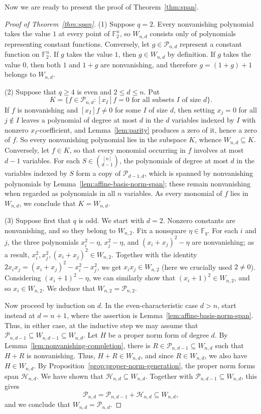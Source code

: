 \documentclass[12pt,reqno]{amsart}
\theoremstyle{definition}
\newcommand{\F}{\mathbb{F}}
\newcommand{\cH}{\mathcal H}
\newcommand{\cP}{\mathcal P}
\begin{document}
Now we are ready to present the proof of Theorem~\ref{thm:span}.

\begin{proof}[Proof of Theorem~\ref{thm:span}]
(1) Suppose $q=2$. Every nonvanishing polynomial takes the value $1$ at every point of $\F_2^n$, so $W_{n,d}$ consists only of polynomials representing constant functions. Conversely, let $g\in\cP_{n,d}$ represent a constant function on $\F_2^n$. If $g$ takes the value $1$, then $g\in W_{n,d}$ by definition. If $g$ takes the value $0$, then both $1$ and $1+g$ are nonvanishing, and therefore $g=(1+g)+1$ belongs to $W_{n,d}$. 

(2) Suppose that $q\geq 4$ is even and $2\leq d\leq n$. Put
\[
K=\{f\in\cP_{n,d}: [x_I]f = 0 \text{ for all subsets } I \text{ of size $d$}\}.
\]
If $f$ is nonvanishing and $[x_I]f\neq0$ for some $I$ of size $d$, then setting $x_j=0$ for all $j\notin I$ leaves a polynomial of degree at most $d$ in the $d$ variables indexed by $I$ with nonzero $x_I$-coefficient, and Lemma~\ref{lem:parity} produces a zero of it, hence a zero of $f$. So every nonvanishing polynomial lies in the subspace $K$, whence $W_{n,d}\subseteq K$. Conversely, let $f\in K$, so that every monomial occurring in $f$ involves at most $d-1$ variables. For each $S\in\binom{[n]}{d-1}$, the polynomials of degree at most $d$ in the variables indexed by $S$ form a copy of $\cP_{d-1,d}$, which is spanned by nonvanishing polynomials by Lemma~\ref{lem:affine-basis-norm-span}; these remain nonvanishing when regarded as polynomials in all $n$ variables. As every monomial of $f$ lies in $W_{n,d}$, we conclude that $K=W_{n,d}$.

(3) Suppose first that $q$ is odd. We start with $d=2$. Nonzero constants are nonvanishing, and so they belong to $W_{n,2}$. Fix a nonsquare
$\eta\in\mathbb F_q$. For each $i$ and $j$, the three polynomials $x_i^2-\eta$, $x_j^2-\eta$, and $(x_i+x_j)^2-\eta$ are nonvanishing; as a result, $x_i^2, x_j^2, (x_i+x_j)^2\in W_{n,2}$. Together with the identity $2x_ix_j = (x_i+x_j)^2-x_i^2-x_j^2$, we get $x_ix_j\in W_{n,2}$ (here we crucially used $2\neq 0$). Considering $(x_i+1)^2-\eta$, we can similarly show that $(x_i+1)^2\in W_{n,2}$, and so $x_i\in W_{n,2}$. We deduce that $W_{n,2}=\mathcal P_{n,2}$.

Now proceed by induction on $d$. In the even-characteristic case
$d>n$, start instead at $d=n+1$, where the assertion is Lemma~\ref{lem:affine-basis-norm-span}.
Thus, in either case, at the inductive step we may assume that
$\mathcal P_{n,d-1}\subseteq W_{n,d-1}\subseteq W_{n,d}$.
Let $H$ be a proper norm form of degree $d$. By Lemma~\ref{lem:nonvanishing-completion}, there is
$R\in\mathcal P_{n,d-1}\subseteq W_{n,d}$ such that $H+R$ is nonvanishing. Thus, $H+R\in W_{n,d}$, and since $R\in W_{n,d}$, we also have $H\in W_{n,d}$. By Proposition~\ref{prop:proper-norm-generation}, the proper norm forms span $\mathcal H_{n,d}$. We have shown that $\mathcal H_{n,d}\subseteq W_{n,d}$. Together with $\mathcal P_{n,d-1}\subseteq W_{n,d}$, this gives
\[
\cP_{n,d}
 =\cP_{n,d-1}+\cH_{n,d}
 \subseteq W_{n,d},
\]
and we conclude that $W_{n,d}=\cP_{n,d}$.
\end{proof}
\end{document}
